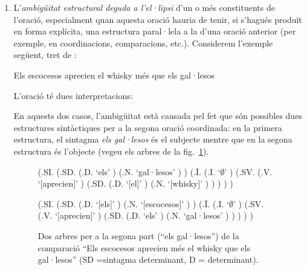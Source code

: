 \begin{enumerate}
  
\item L'\emph{ambigüitat estructural deguda a l'el·lipsi} d'un o més
  constituents de l'oració, especialment quan aquesta oració hauria de
  tenir, si s'hagués produït en forma explícita, una estructura
  paral·lela a la d'una oració anterior (per exemple, en
  coordinacions, comparacions, etc.).  Considerem l'exemple següent,
  tret de \citet[p.~399]{radford09b}: 
  \begin{exemple}
  \label{eq:escocesos}
  Els escocesos aprecien el
    whisky més que els gal·lesos
  \end{exemple} L'oració té dues interpretacions:
  En aquests dos casos, l'ambigüitat està causada pel fet que són
  possibles dues estructures sintàctiques per a la segona oració
  coordinada: en la primera estructura, el sintagma \emph{els
    gal·lesos} és el subjecte mentre que en la segona estructura és
  l'objecte (vegeu els arbres de la fig.~\ref{fg:whisky}).

\begin{figure}
\begin{center}
\begin{parsetree}
(.SI. (.SD. (.D. `els' ) (.N. `gal·lesos' ) ) (.{\={I}}. (.I.  `$\emptyset$' )
(.SV. (.V. `[aprecien]' ) (.SD. (.D. `[el]' ) (.N. `[whisky]' ) ) ) ) )
\end{parsetree}
\end{center}
\begin{center}
\begin{parsetree}
(.SI. (.SD. (.D. `[els]' ) (.N. `[escocesos]' ) ) (.{\={I}}. (.I. `$\emptyset$' )
(.SV. (.V. `[aprecien]' ) (.SD. (.D. `els' ) (.N. `gal·lesos' ) ) ) ) )
\end{parsetree}
\end{center}
\caption{Dos arbres per a la segona part (``els gal·lesos'') de la
  comparació ``Els escocesos aprecien més el whisky que els
  gal·lesos'' (SD =sintagma determinant, D = determinant).}
\label{fg:whisky}
\end{figure}


\end{enumerate}
